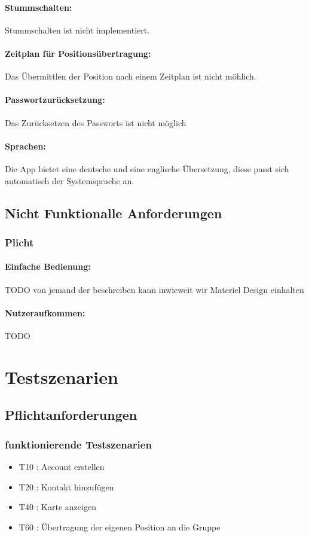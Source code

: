 \documentclass[parskip=full,11pt]{scrartcl}
\begin{document}
\paragraph{Stummschalten:}
Stummschalten ist nicht implementiert.

\paragraph{Zeitplan für Positionsübertragung:}
Das Übermittlen der Position nach einem Zeitplan ist nicht möhlich.

\paragraph{Passwortzurücksetzung:}
Das Zurücksetzen des Passworts ist nicht möglich

\paragraph{Sprachen:}
Die App bietet eine deutsche und eine englische Übersetzung, diese passt sich
automatisch der Systemsprache an.

\subsection{Nicht Funktionalle Anforderungen}
\subsubsection{Plicht}
\paragraph{Einfache Bedienung:}
TODO von jemand der beschreiben kann inwieweit wir Materiel Design einhalten

\paragraph{Nutzeraufkommen:}
TODO

\section{Testszenarien}

\subsection{Pflichtanforderungen}
	\subsubsection{funktionierende Testszenarien}
	\begin{itemize}
		\item T10 : Account erstellen
		\item T20 : Kontakt hinzufügen
		\item T40 : Karte anzeigen
		\item T60 : Übertragung der eigenen Position an die Gruppe
	\end{itemize}
\end{document}

